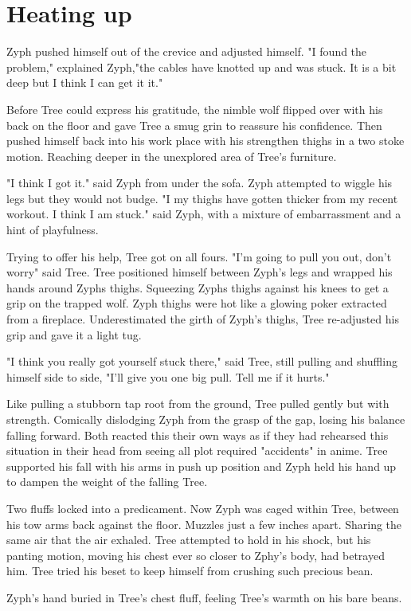 \chapter{Heating up}

Zyph pushed himself out of the crevice and adjusted himself. "I found the problem," explained Zyph,"the cables have knotted up and was stuck. It is a bit deep but I think I can get it it."

Before Tree could express his gratitude, the nimble wolf flipped over with his back on the floor and gave Tree a smug grin to reassure his confidence. Then pushed himself back into his work place with his strengthen thighs in a two stoke motion. Reaching deeper in the unexplored area of Tree's furniture.

"I think I got it." said Zyph from under the sofa. Zyph attempted to wiggle his legs but they would not budge. "I my thighs have gotten thicker from my recent workout. I think I am stuck." said Zyph, with a mixture of embarrassment and a hint of playfulness.

Trying to offer his help, Tree got on all fours. "I'm going to pull you out, don't worry" said Tree. Tree positioned himself between Zyph's legs and wrapped his hands around Zyphs thighs. Squeezing Zyphs thighs against his knees to get a grip on the trapped wolf. Zyph thighs were hot like a  glowing poker extracted from a fireplace. Underestimated the girth of Zyph's thighs, Tree re-adjusted his grip and gave it a light tug.

"I think you really got yourself stuck there," said Tree, still pulling and shuffling himself side to side, "I'll give you one big pull. Tell me if it hurts."

Like pulling a stubborn tap root from the ground, Tree pulled gently but with strength. Comically dislodging Zyph from the grasp of the gap, losing his balance falling forward. Both reacted this their own ways as if they had rehearsed this situation in their head from seeing all plot required "accidents" in anime. Tree supported his fall with his arms in push up position and Zyph held his hand up to dampen the weight of the falling Tree.

Two fluffs locked into a predicament. Now Zyph was caged within Tree, between his tow arms back against the floor. Muzzles just a few inches apart. Sharing the same air that the air exhaled. Tree attempted to hold in his shock, but his panting motion, moving his chest ever so closer to Zphy's body, had betrayed him. Tree tried his beset to keep himself from crushing such precious bean.

Zyph's hand buried in Tree's chest fluff, feeling Tree's warmth on his bare beans. 